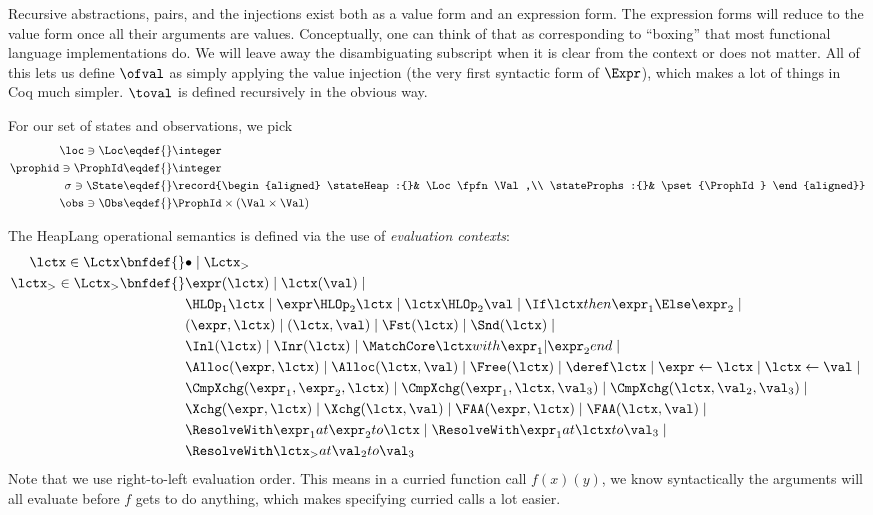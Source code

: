 Recursive abstractions, pairs, and the injections exist both as a value form and an expression form.
The expression forms will reduce to the value form once all their arguments are values.
Conceptually, one can think of that as corresponding to ``boxing'' that most functional language implementations do.
We will leave away the disambiguating subscript when it is clear from the context or does not matter.
All of this lets us define $\ofval$ as simply applying the value injection (the very first syntactic form of $\Expr$), which makes a lot of things in Coq much simpler.
$\toval$ is defined recursively in the obvious way.

For our set of states and observations, we pick
\begin{align*}
  \loc \ni \Loc \eqdef{}& \integer \\
  \prophid \ni \ProphId \eqdef{}& \integer \\
  \sigma \ni \State \eqdef{}& \record{\begin{aligned}
                   \stateHeap:{}& \Loc \fpfn \Val,\\
                   \stateProphs:{}& \pset{\ProphId}
                 \end{aligned}} \\
  \obs \ni \Obs \eqdef{}& \ProphId \times (\Val \times \Val)
\end{align*}

The HeapLang operational semantics is defined via the use of \emph{evaluation contexts}:
\begin{align*}
\lctx \in \Lctx \bnfdef{}&
  \bullet \mid \Lctx_{>} \\
\lctx_{>} \in \Lctx_{>} \bnfdef{}&
  \expr(\lctx) \mid
  \lctx (\val) \mid
  {}\\ &
  \HLOp_1 \lctx \mid
  \expr \HLOp_2 \lctx \mid
  \lctx \HLOp_2 \val \mid
  \If \lctx then \expr_1 \Else \expr_2 \mid
  {}\\ &
  (\expr, \lctx) \mid
  (\lctx, \val) \mid
  \Fst(\lctx) \mid
  \Snd(\lctx) \mid
  {}\\ &
  \Inl(\lctx) \mid
  \Inr(\lctx) \mid
  \MatchCore \lctx with \expr_1 | \expr_2 end \mid
  {}\\ &
  \Alloc(\expr, \lctx) \mid
  \Alloc(\lctx, \val) \mid
  \Free(\lctx) \mid
  \deref \lctx \mid
  \expr \gets \lctx \mid
  \lctx \gets \val \mid
  {}\\ &
  \CmpXchg(\expr_1, \expr_2, \lctx) \mid
  \CmpXchg(\expr_1, \lctx, \val_3) \mid
  \CmpXchg(\lctx, \val_2, \val_3) \mid
  {}\\ &
  \Xchg(\expr, \lctx) \mid
  \Xchg(\lctx, \val) \mid
  \FAA(\expr, \lctx) \mid
  \FAA(\lctx, \val) \mid
  {}\\ &
  \ResolveWith \expr_1 at \expr_2 to \lctx \mid
  \ResolveWith \expr_1 at \lctx to \val_3 \mid
  {}\\ &
  \ResolveWith \lctx_{>} at \val_2 to \val_3
\end{align*}
Note that we use right-to-left evaluation order.
This means in a curried function call $f(x)(y)$, we know syntactically the arguments will all evaluate before $f$ gets to do anything, which makes specifying curried calls a lot easier.

